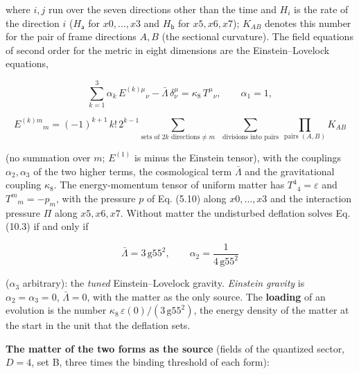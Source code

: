 \documentclass[
  10pt,
]{article}
\begin{document}
where \(i,j\) run over the seven directions other than the time and
\(H_i\) is the rate of the direction \(i\) (\(H_{\mathsf a}\) for
\(x0,\dots,x3\) and \(H_{\mathsf b}\) for \(x5,x6,x7\)); \(K_{AB}\)
denotes this number for the pair of frame directions \(A,B\) (the
sectional curvature). The field equations of second order for the metric
in eight dimensions are the Einstein--Lovelock equations,

\[\sum_{k=1}^{3}\alpha_k\,E^{(k)\mu}{}_{\nu}-\bar\Lambda\,\delta^\mu_\nu=\kappa_8\,T^\mu{}_\nu,\qquad\alpha_1=1,\tag{10.3}\]

\[E^{(k)m}{}_{m}=(-1)^{k+1}\,k!\,2^{k-1}\sum_{\text{sets of }2k\text{ directions}\neq m}\ \ \sum_{\text{divisions into pairs}}\ \prod_{\text{pairs }(A,B)}K_{AB}\tag{10.4}\]

(no summation over \(m\); \(E^{(1)}\) is minus the Einstein tensor),
with the couplings \(\alpha_2,\alpha_3\) of the two higher terms, the
cosmological term \(\bar\Lambda\) and the gravitational coupling
\(\kappa_8\). The energy-momentum tensor of uniform matter has
\(T^4{}_4=\varepsilon\) and \(T^m{}_m=-p_m\), with the pressure \(p\) of
Eq. (5.10) along \(x0,\dots,x3\) and the interaction pressure \(\Pi\)
along \(x5,x6,x7\). Without matter the undisturbed deflation solves Eq.
(10.3) if and only if

\[\bar\Lambda=3\,\mathrm{g55}^2,\qquad\alpha_2=\frac1{4\,\mathrm{g55}^2}\tag{10.5}\]

(\(\alpha_3\) arbitrary): the \emph{tuned} Einstein--Lovelock gravity.
\emph{Einstein gravity} is \(\alpha_2=\alpha_3=0\), \(\bar\Lambda=0\),
with the matter as the only source. The \textbf{loading} of an evolution
is the number \(\kappa_8\,\varepsilon(0)/(3\,\mathrm{g55}^2)\), the
energy density of the matter at the start in the unit that the deflation
sets.

\textbf{The matter of the two forms as the source} (fields of the
quantized sector, \(D=4\), set B, three times the binding threshold of
each form):
\end{document}
